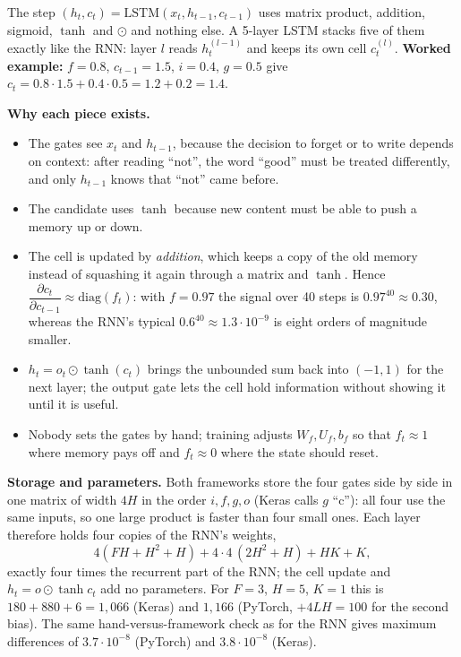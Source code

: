 The step $(h_t,c_t)=\mathrm{LSTM}(x_t,h_{t-1},c_{t-1})$ uses matrix product, addition, sigmoid, $\tanh$ and $\odot$ and nothing else. A 5-layer LSTM stacks five of them exactly like the RNN: layer $l$ reads $h^{(l-1)}_t$ and keeps its own cell $c^{(l)}_t$.
\textbf{Worked example:} $f=0.8$, $c_{t-1}=1.5$, $i=0.4$, $g=0.5$ give $c_t=0.8\cdot1.5+0.4\cdot0.5=1.2+0.2=1.4$.

\textbf{Why each piece exists.}
\begin{itemize}
\item The gates see $x_t$ and $h_{t-1}$, because the decision to forget or to write depends on context: after reading ``not'', the word ``good'' must be treated differently, and only $h_{t-1}$ knows that ``not'' came before.
\item The candidate uses $\tanh$ because new content must be able to push a memory up or down.
\item The cell is updated by \emph{addition}, which keeps a copy of the old memory instead of squashing it again through a matrix and $\tanh$. Hence
$\dfrac{\partial c_t}{\partial c_{t-1}}\approx\mathrm{diag}(f_t)$: with $f=0.97$ the signal over 40 steps is $0.97^{40}\approx0.30$, whereas the RNN's typical $0.6^{40}\approx1.3\cdot10^{-9}$ is eight orders of magnitude smaller.
\item $h_t=o_t\odot\tanh(c_t)$ brings the unbounded sum back into $(-1,1)$ for the next layer; the output gate lets the cell hold information without showing it until it is useful.
\item Nobody sets the gates by hand; training adjusts $W_f,U_f,b_f$ so that $f_t\approx1$ where memory pays off and $f_t\approx0$ where the state should reset.
\end{itemize}

\textbf{Storage and parameters.} Both frameworks store the four gates side by side in one matrix of width $4H$ in the order $i,f,g,o$ (Keras calls $g$ ``c''): all four use the same inputs, so one large product is faster than four small ones.
Each layer therefore holds four copies of the RNN's weights,
\begin{equation}
4(FH+H^2+H)+4\cdot4\,(2H^2+H)+HK+K ,
\end{equation}
exactly four times the recurrent part of the RNN; the cell update and $h_t=o\odot\tanh c_t$ add no parameters. For $F=3$, $H=5$, $K=1$ this is $180+880+6=1{,}066$ (Keras) and $1{,}166$ (PyTorch, $+4LH=100$ for the second bias).
The same hand-versus-framework check as for the RNN gives maximum differences of $3.7\cdot10^{-8}$ (PyTorch) and $3.8\cdot10^{-8}$ (Keras).

